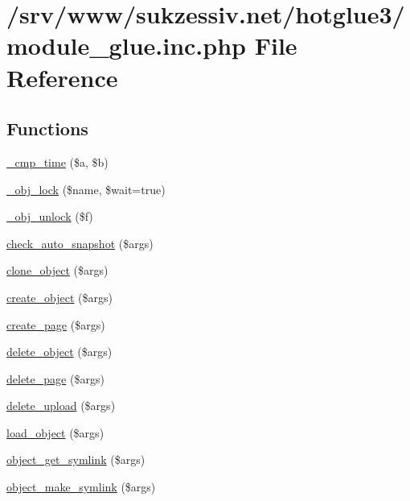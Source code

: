 \hypertarget{module__glue_8inc_8php}{
\section{/srv/www/sukzessiv.net/hotglue3/module\_\-glue.inc.php File Reference}
\label{module__glue_8inc_8php}
}
\subsection*{Functions}
\begin{CompactItemize}
\item 
\hyperlink{module__glue_8inc_8php_5fea6c120a24a298149febcbf3b1df10}{\_\-cmp\_\-time} (\$a, \$b)
\item 
\hyperlink{module__glue_8inc_8php_21f260355b875069ca90edf1f9a559d0}{\_\-obj\_\-lock} (\$name, \$wait=true)
\item 
\hyperlink{module__glue_8inc_8php_73a91facde5362e20df9657d31c2bb06}{\_\-obj\_\-unlock} (\$f)
\item 
\hyperlink{module__glue_8inc_8php_aa1103a091b9dbca790e77d25a452ca5}{check\_\-auto\_\-snapshot} (\$args)
\item 
\hyperlink{module__glue_8inc_8php_9c7f39d87787ce288ce3d8a3e389ba95}{clone\_\-object} (\$args)
\item 
\hyperlink{module__glue_8inc_8php_12aa18f28f86274d770ba90aa88e2c3e}{create\_\-object} (\$args)
\item 
\hyperlink{module__glue_8inc_8php_9806cd2a9b829a24876b149753e819fb}{create\_\-page} (\$args)
\item 
\hyperlink{module__glue_8inc_8php_51fdb1d1ff829d6d2d79a9f852b7e0ef}{delete\_\-object} (\$args)
\item 
\hyperlink{module__glue_8inc_8php_f11541a6869804225793b82e54fa09fe}{delete\_\-page} (\$args)
\item 
\hyperlink{module__glue_8inc_8php_a4865d52ac449f8aaadb3a5d425f2efb}{delete\_\-upload} (\$args)
\item 
\hyperlink{module__glue_8inc_8php_c6b5ed5ff055ccb4d07ad17cf78d5a11}{load\_\-object} (\$args)
\item 
\hyperlink{module__glue_8inc_8php_a9618d306b7ee5bd9e5d6a0be268ed44}{object\_\-get\_\-symlink} (\$args)
\item 
\hyperlink{module__glue_8inc_8php_14e6da411df5aa9ff38e2d4ea27dd077}{object\_\-make\_\-symlink} (\$args)
\item 

\end{CompactItemize}
